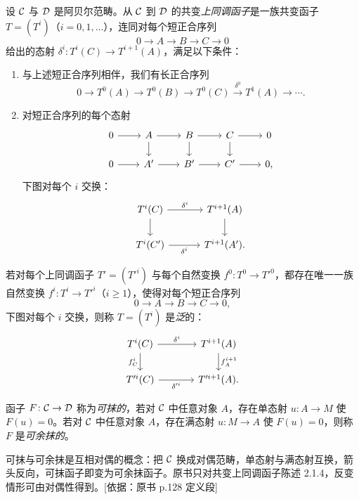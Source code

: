 设 $\mathcal{C}$ 与 $\mathcal{D}$ 是阿贝尔范畴。从 $\mathcal{C}$ 到 $\mathcal{D}$ 的共变\emph{上同调函子}是一族共变函子 $T=(T^i)$（$i=0,1,\dots$），连同对每个短正合序列
\[
0\to A\to B\to C\to 0
\]
给出的态射 $\delta^i\colon T^i(C)\to T^{i+1}(A)$，满足以下条件：
\begin{enumerate}[label=(\roman*),leftmargin=2.4em]
  \item 与上述短正合序列相伴，我们有长正合序列
  \[
  0\to T^0(A)\to T^0(B)\to T^0(C)\xrightarrow{\delta^0}T^1(A)\to\cdots.
  \]
  \item 对短正合序列的每个态射
  \[\begin{tikzcd}[column sep=2.2em,row sep=1.5em]
  0 \arrow[r] & A \arrow[r] \arrow[d] & B \arrow[r] \arrow[d] & C \arrow[r] \arrow[d] & 0 \\
  0 \arrow[r] & A' \arrow[r] & B' \arrow[r] & C' \arrow[r] & 0,
  \end{tikzcd}\]
  下图对每个 $i$ 交换：
  \[\begin{tikzcd}[column sep=3.2em,row sep=1.8em]
  T^i(C) \arrow[r,"\delta^i"] \arrow[d] & T^{i+1}(A) \arrow[d] \\
  T^i(C') \arrow[r,"\delta^i"'] & T^{i+1}(A').
  \end{tikzcd}\]
\end{enumerate}

若对每个上同调函子 $T'=(T'^i)$ 与每个自然变换 $f^0\colon T^0\to T'^0$，都存在唯一一族自然变换 $f^i\colon T^i\to T'^i$（$i\ge1$），使得对每个短正合序列
\[
0\to A\to B\to C\to 0,
\]
下图对每个 $i$ 交换，则称 $T=(T^i)$ 是\emph{泛}的：
\[\begin{tikzcd}[column sep=3.6em,row sep=1.8em]
T^i(C) \arrow[r,"\delta^i"] \arrow[d,"f^i_C"'] & T^{i+1}(A) \arrow[d,"f^{i+1}_A"] \\
T'^i(C) \arrow[r,"\delta'^i"'] & T'^{i+1}(A).
\end{tikzcd}\]

函子 $F\colon\mathcal{C}\to\mathcal{D}$ 称为\emph{可抹的}，若对 $\mathcal{C}$ 中任意对象 $A$，存在单态射 $u\colon A\to M$ 使 $F(u)=0$。若对 $\mathcal{C}$ 中任意对象 $A$，存在满态射 $u\colon M\to A$ 使 $F(u)=0$，则称 $F$ 是\emph{可余抹的}。
\begin{tnote}
可抹与可余抹是互相对偶的概念：把 $\mathcal{C}$ 换成对偶范畴，单态射与满态射互换，箭头反向，可抹函子即变为可余抹函子。原书只对共变上同调函子陈述 2.1.4，反变情形可由对偶性得到。[依据：原书 p.128 定义段]
\end{tnote}

